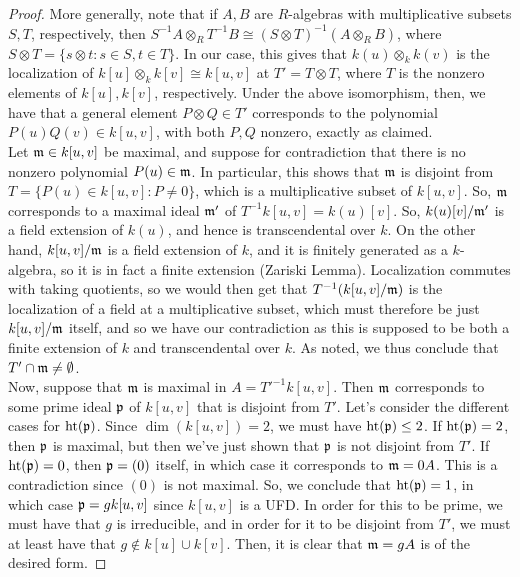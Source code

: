 \begin{proof}
	More generally, note that if $A,B$ are $R$-algebras with multiplicative subsets $S,T$, respectively, then $S^{-1}A \otimes_R T^{-1}B \cong (S \otimes T)^{-1}(A \otimes_R B)$, where $S \otimes T = \{ s \otimes t : s \in S,t \in T \}$. In our case, this gives that $k(u) \otimes_k k(v)$ is the localization of $k[u] \otimes_k k[v] \cong k[u,v]$ at $T' = T \otimes T$, where $T$ is the nonzero elements of $k[u],k[v]$, respectively. Under the above isomorphism, then, we have that a general element $P \otimes Q \in T'$ corresponds to the polynomial $P(u)Q(v) \in k[u,v]$, with both $P,Q$ nonzero, exactly as claimed. \\
	
	Let $\mathfrak{m} \in k[u,v]$ be maximal, and suppose for contradiction that there is no nonzero polynomial $P(u) \in \mathfrak{m}$. In particular, this shows that $\mathfrak{m}$ is disjoint from $T = \{ P(u) \in k[u,v] : P \neq 0 \}$, which is a multiplicative subset of $k[u,v]$. So, $\mathfrak{m}$ corresponds to a maximal ideal $\mathfrak{m}'$ of $T^{-1}k[u,v] = k(u)[v]$. So, $k(u)[v]/\mathfrak{m}'$ is a field extension of $k(u)$, and hence is transcendental over $k$. On the other hand, $k[u,v]/\mathfrak{m}$ is a field extension of $k$, and it is finitely generated as a $k$-algebra, so it is in fact a finite extension (Zariski Lemma). Localization commutes with taking quotients, so we would then get that $T^{-1}(k[u,v]/\mathfrak{m})$ is the localization of a field at a multiplicative subset, which must therefore be just $k[u,v]/\mathfrak{m}$ itself, and so we have our contradiction as this is supposed to be both a finite extension of $k$ and transcendental over $k$. As noted, we thus conclude that $T' \cap \mathfrak{m} \neq \emptyset$. \\
	
	Now, suppose that $\mathfrak{m}$ is maximal in $A = T'^{-1}k[u,v]$. Then $\mathfrak{m}$ corresponds to some prime ideal $\mathfrak{p}$ of $k[u,v]$ that is disjoint from $T'$. Let's consider the different cases for $\operatorname{ht}(\mathfrak{p})$. Since $\dim(k[u,v]) = 2$, we must have $\operatorname{ht}(\mathfrak{p}) \leq 2$. If $\operatorname{ht}(\mathfrak{p}) = 2$, then $\mathfrak{p}$ is maximal, but then we've just shown that $\mathfrak{p}$ is not disjoint from $T'$. If $\operatorname{ht}(\mathfrak{p}) = 0$, then $\mathfrak{p} = (0)$ itself, in which case it corresponds to $\mathfrak{m} = 0A$. This is a contradiction since $(0)$ is not maximal. So, we conclude that $\operatorname{ht}(\mathfrak{p}) = 1$, in which case $\mathfrak{p} = gk[u,v]$ since $k[u,v]$ is a UFD. In order for this to be prime, we must have that $g$ is irreducible, and in order for it to be disjoint from $T'$, we must at least have that $g \notin k[u] \cup k[v]$. Then, it is clear that $\mathfrak{m} = gA$ is of the desired form.
	

\end{proof}
